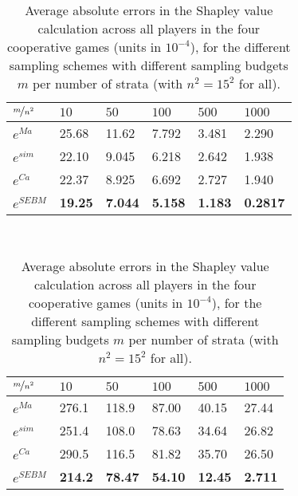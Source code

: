 



\begin{table}[]
    \centering 
    \begin{minipage}[]{0.8\textwidth}
        \centering
        \caption{Simple Reward Division Game average errors}\label{tab3}
			\begin{tabular}{llllll}
			\hline
			$\nicefrac{m}{n^2}$ & $10$ & $50$ & $100$ & $500$ & $1000$ \\
			\hline
			$e^{Ma}$    & 25.68 & 11.62 & 7.792 & 3.481 & 2.290 \\
			$e^{sim}$   & 22.10 & 9.045 & 6.218 & 2.642 & 1.938 \\
			$e^{Ca}$    & 22.37 & 8.925 & 6.692 & 2.727 & 1.940 \\
			$e^{SEBM}$  & \textbf{19.25} & \textbf{7.044} & \textbf{5.158} & \textbf{1.183} & \textbf{0.2817}  \\
			\hline
			\end{tabular}
    \end{minipage}
	\\\vspace{4mm}
    \begin{minipage}[]{0.8\textwidth}
        \centering
        \caption{Complex Reward Division Game average errors}\label{tab4}
			\centering
			\begin{tabular}{llllll}
			\hline
			$\nicefrac{m}{n^2}$ & $10$ & $50$ & $100$ & $500$ & $1000$ \\
			\hline
			$e^{Ma}$   & 276.1 & 118.9 & 87.00 & 40.15 & 27.44 \\
			$e^{sim}$  & 251.4 & 108.0 & 78.63 & 34.64 & 26.82 \\
			$e^{Ca}$   & 290.5 & 116.5 & 81.82 & 35.70 & 26.50 \\
			$e^{SEBM}$ & \textbf{214.2} & \textbf{78.47} & \textbf{54.10} & \textbf{12.45} & \textbf{2.711}  \\
			\hline
			\end{tabular}
    \end{minipage}
    \vspace{3mm}
    \caption[Average errors approximating the Shapley Value across games and methods]{Average absolute errors in the Shapley value calculation across all players in the four cooperative games (units in $10^{-4}$), for the different sampling schemes with different sampling budgets $m$ per number of strata (with $n^2=15^2$ for all).}
    \label{Table2}
\end{table}
